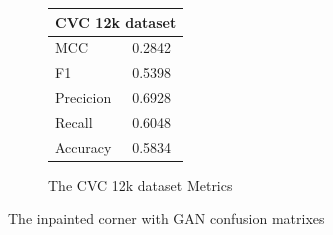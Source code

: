 \begin{figure}
\begin{subfigure}[b]{0.25\textwidth}
        \begin{tabular}{ll}
        \toprule
        \multicolumn{2}{c}{CVC 12k dataset}        \\
        \midrule
        MCC 		& 0.2842 \\
        F1  		& 0.5398 \\
        Precicion  	& 0.6928 \\
        Recall     	& 0.6048 \\
        Accuracy	& 0.5834 \\
        \bottomrule
        \end{tabular}
\caption{The CVC 12k dataset Metrics}
\label{tab:cvc12k_metrics_DN121_GAN_CORNER}
\end{subfigure}
\caption{The inpainted corner with GAN confusion matrixes}
\label{fig:results_DN121_GAN_CORNER}
\end{figure}
\FloatBarrier




